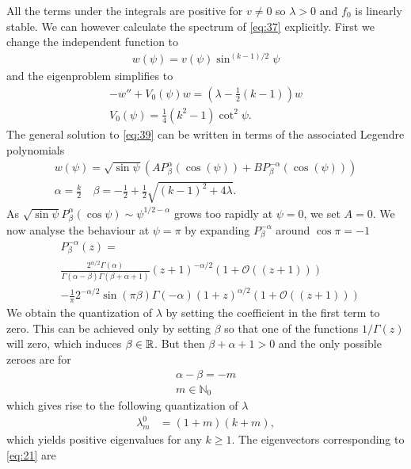 All the terms under the integrals are positive for $v\ne0$ so
$\lambda>0$ and $f_0$ is linearly stable. We can however calculate the
spectrum of \eqref{eq:37} explicitly. First we change the independent
function to
\begin{align}
  \label{eq:38}
  w(\psi)= v(\psi)\sin^{(k-1)/2}\psi
\end{align}
and the eigenproblem simplifies to
\begin{align}
  \label{eq:39}
  -w''+V_0(\psi)w=\left(\lambda-\frac{1}{2}(k-1)\right)w\\
  V_0(\psi)=\frac{1}{4}(k^2-1)\cot^2\psi.
\end{align}
The general solution to \eqref{eq:39} can be written in terms of the
associated Legendre polynomials
\begin{align}
  \label{eq:40}
  w(\psi)=\sqrt{\sin\psi}\left(
    AP^\alpha_{\beta}(\cos(\psi))+BP^{-\alpha}_{\beta}(\cos(\psi))
  \right)\\
  \label{eq:41}
  \alpha=\frac{k}{2}\quad \beta=-\frac{1}{2}+\frac{1}{2}\sqrt{(k-1)^2+4\lambda}.
\end{align}
As $\sqrt{\sin\psi}P_\beta^{\alpha}(\cos\psi)\sim\psi^{1/2-\alpha}$
grows too rapidly at $\psi=0$, we set $A=0$. We now analyse the
behaviour at $\psi=\pi$ by expanding $P_\beta^{-\alpha}$ around
$\cos\pi=-1$
\begin{align}
  \label{eq:2}
  &P_\beta^{-\alpha}(z)=\\
  &\frac{2^{\alpha/2}\Gamma(\alpha)}{\Gamma(\alpha-\beta)\Gamma(\beta+\alpha+1)}
  (z+1)^{-\alpha/2}(1+\mathcal{O}((z+1)))\\
  &-\frac{1}{\pi}2^{-\alpha/2}\sin(\pi\beta)\Gamma(-\alpha)
  (1+z)^{\alpha/2}(1+\mathcal{O}((z+1)))
\end{align}
We obtain the quantization of $\lambda$ by setting the coefficient in
the first term to zero. This can be achieved only by setting $\beta$
so that one of the functions $1/\Gamma(z)$ will zero, which induces
$\beta\in\mathbb{R}$. But then $\beta+\alpha+1>0$ and the only possible zeroes
are for
\begin{align}
  \label{eq:3}
  \alpha-\beta=-m\\
  m\in\mathbb{N}_0
\end{align}
which gives rise to the following quantization of $\lambda$
\begin{align}
  \label{eq:6}
  \lambda_m^0&=(1+m)(k+m),
\end{align}
which yields positive eigenvalues for any $k\ge1$. The eigenvectors
corresponding to \eqref{eq:21} are
